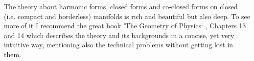 The theory about harmonic forms, closed forms and co-closed forms on closed (i.e. compact and borderless) manifolds is rich and beautiful but also deep. To see more of it I recommend the great book 'The Geometry of Physics` \note{[...]}, Chapters 13 and 14 which describes the theory and its backgrounds in a concise, yet very intuitive way, mentioning also the technical problems without getting lost in them.

%
%
%
%
